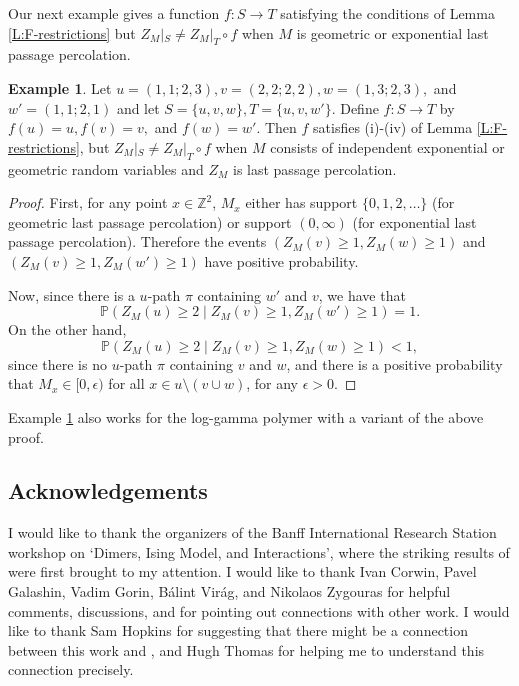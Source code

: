 \documentclass[aop, preprint]{imsart}
\theoremstyle{plain}
\theoremstyle{definition}
\newtheorem{example}[theorem]{Example} %
\theoremstyle{plain}
\newcommand{\p}{\mathbb{P}}
\newcommand{\ep}{\epsilon}
\newcommand{\Z}{\mathds{Z}}
\newcommand{\smin}{\setminus}
\begin{document}
Our next example gives a function $f:S \to T$ satisfying the conditions of Lemma \ref{L:F-restrictions} but $Z_M|_{S} \ne Z_M|_{T} \circ f$ when $M$ is geometric or exponential last passage percolation.

\begin{example}
	\label{E:not-in-F}
	Let $u = (1, 1; 2, 3), v = (2, 2; 2, 2), w = (1, 3;2, 3),$ and $w' =(1, 1; 2, 1)$ and let $S = \{u, v, w\}, T = \{u, v, w'\}$. Define $f:S \to T$ by $f(u) = u, f(v) = v,$ and $f(w) = w'$. Then $f$ satisfies (i)-(iv) of Lemma \ref{L:F-restrictions}, but $Z_M|_{S} \ne Z_M|_{T} \circ f$ when $M$ consists of independent exponential or geometric random variables and $Z_M$ is last passage percolation.
\end{example}

\begin{proof}
	First, for any point $x \in \Z^2$, $M_x$ either has support $\{0, 1, 2, \dots\}$ (for geometric last passage percolation) or support $(0, \infty)$ (for exponential last passage percolation). Therefore the events $(Z_M(v) \ge 1, Z_M(w) \ge 1)$ and $(Z_M(v) \ge 1, Z_M(w') \ge 1)$ have positive probability.
	
	Now, since there is a $u$-path $\pi$ containing $w'$ and $v$, we have that
	$$
	\p(Z_M(u) \ge 2 \;|\; Z_M(v) \ge 1, Z_M(w') \ge 1) = 1.
	$$
	On the other hand,
	$$
	\p(Z_M(u) \ge 2 \;|\; Z_M(v) \ge 1, Z_M(w) \ge 1) < 1,
	$$
	since there is no $u$-path $\pi$ containing $v$ and $w$, and there is a positive probability that $ M_x \in [0, \ep)$ for all $x \in u \smin (v \cup w)$, for any $\ep > 0$.
\end{proof}

Example \ref{E:not-in-F} also works for the log-gamma polymer with a variant of the above proof. 

\subsection*{Acknowledgements} I would like to thank the organizers of the Banff International Research Station workshop on `Dimers, Ising Model, and Interactions', where the striking results of \citep{borodin2019shift} were first brought to my attention. I would like to thank Ivan Corwin, Pavel Galashin, Vadim Gorin, B\'alint Vir\'ag, and Nikolaos Zygouras for helpful comments, discussions, and for pointing out connections with other work. I would like to thank Sam Hopkins for suggesting that there might be a connection between this work and \cite{garver}, and Hugh Thomas for helping me to understand this connection precisely. 



\end{document}
